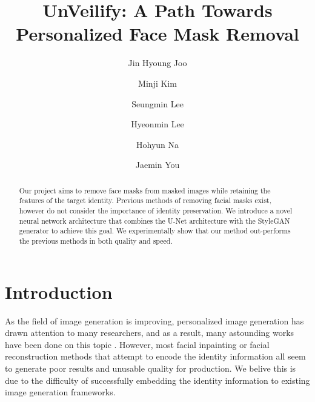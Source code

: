 \documentclass[sigconf,authorversion,nonacm]{acmart}
\begin{document}
\title{UnVeilify: A Path Towards Personalized Face Mask Removal}

\author{Jin Hyoung Joo}

\author{Minji Kim}

\author{Seungmin Lee}

\author{Hyeonmin Lee}

\author{Hohyun Na}

\author{Jaemin You}

\begin{abstract}
    Our project aims to remove face masks from masked images while retaining the features
    of the target identity. Previous methods of removing facial masks exist,
    however do not consider the importance of identity preservation. We introduce
    a novel neural network architecture that combines the U-Net architecture with
    the StyleGAN generator to achieve this goal. We experimentally show that our method
    out-performs the previous methods in both quality and speed.
\end{abstract}

\maketitle

\section{Introduction}
As the field of image generation is improving,
personalized image generation has drawn attention to many researchers, and as a
result, many astounding works have been done on this topic \cite{InstantBooth, SubjectDiffusion}.
However, most facial inpainting or facial reconstruction methods that attempt to encode the identity information \cite{SymmFC, IPFC, RGLSRI} all seem to
generate poor results and unusable quality for production. We belive this is due to the difficulty of successfully embedding the identity information to existing image generation frameworks.
\end{document}
